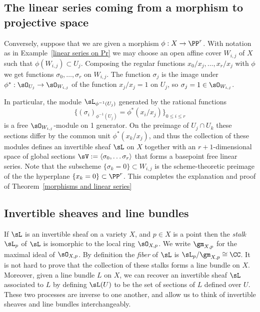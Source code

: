 \subsection{The linear series coming from a morphism to projective space}

Conversely, suppose that we are given a morphism $\phi: X\to \PP^{r}$. With notation as in Example~\ref{linear series on Pr} we may choose an open affine cover $W_{i,j}$ of $X$ such that $\phi(W_{i,j})\subset U_{j}$. Composing the regular
functions
$x_{0}/x_{j},\dots, x_{r}/x_{j}$ with $\phi$ we get functions $\sigma_{0},\dots,\sigma_{r}$ on $W_{i,j}$.  The function $\sigma_{j}$ is the image under $\phi^*: \sO_{U_j} \to \sO_{W_{i,j}}$ of the function $x_j/x_j = 1$ on $U_{j}$, so $\sigma_j = 1\in \sO_{W_{i,j}}$. 

In particular, the module $\sL_{\phi^{-1}(U_j)}$ generated by the rational functions 
$$
\{(\sigma_i)_{\phi^{-1}(U_j)} = \phi^*(x_i/x_j)\}_{0\leq i\leq r}
$$
 is a free $\sO_{W_{i,j}}$-module on 1 generator. On the preimage of $U_j\cap U_k$ these sections differ by the common unit $\phi^*(x_k/x_j)$, and thus the collection of these modules defines an invertible sheaf $\sL$ on $X$ together with an
$r+1$-dimensional space of global sections $\sV := \langle \sigma_0,\dots \sigma_r\rangle$ that forms a basepoint free linear series. Note that the subscheme  $\{\sigma_k = 0\} \subset W_{i,j}$  is the scheme-theoretic preimage of the
the hyperplane $\{x_k = 0\}\subset \PP^r$. This completes the explanation and proof of Theorem~\ref{morphisms and linear series}

\subsection{Invertible sheaves and line bundles}

If $\sL$ is an invertible sheaf on a variety $X$, and $p\in X$ is a point then the \emph{stalk} $\sL_p$ of $\sL$ is isomorphic to the local
ring $\sO_{X,p}$. We write $\gm_{X,p}$ for the maximal ideal of $\sO_{X,p}$. By definition the \emph{fiber} of $\sL$ is 
$\sL_p/\gm_{X,p}\cong \CC$. It is not hard to prove that the collection of these stalks forms a line bundle on $X$. Moreover,
given a line bundle $L$ on $X$, we can recover an invertible sheaf $\sL$ associated to $L$ by defining
$\sL(U)$ to be the set of sections of $L$ defined over $U$. These two processes are inverse to one another, and allow
us to think of invertible sheaves and line bundles interchangeably.

